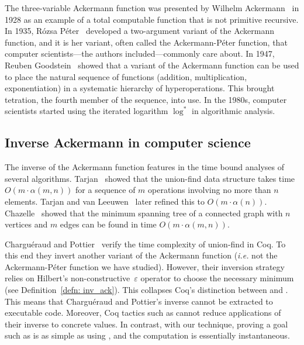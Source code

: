 The three-variable Ackermann function was presented by Wilhelm Ackermann~\cite{ackermann} in 1928 as an example of a total computable function that is not primitive recursive.
In 1935, Rózsa Péter~\cite{peter} developed a two-argument variant of the Ackermann 
function, and it is her variant, often called the Ackermann-Péter function,
that computer scientists---the authors included---commonly care about.
In 1947, Reuben Goodstein~\cite{goodstein} showed that a variant of the Ackermann function 
can be used to place the natural sequence of functions (addition, multiplication,
exponentiation) in a systematic hierarchy of hyperoperations. 
This brought tetration, the fourth member of the sequence, into use.
In the 1980s, computer scientists started using the
iterated logarithm $\log^*$ in algorithmic analysis.

\subsection{Inverse Ackermann in computer science}

The inverse of the Ackermann function
features in the time bound analyses of several algorithms.
Tarjan~\cite{tarjan} showed that the union-find data structure
takes time \mbox{$O(m\cdot\alpha(m,n))$} for a sequence of $m$ operations
involving no more than $n$ elements.
Tarjan and van Leeuwen~\cite{tarjan2} later refined this to $O(m\cdot\alpha(n))$.
Chazelle~\cite{chazelle} showed that the minimum spanning tree
of a connected graph with $n$ vertices and $m$ edges
can be found in time $O(m\cdot\alpha(m,n))$.

Chargu\'eraud and Pottier~\cite{charpott}
verify the time complexity of union-find in Coq.
To this end they invert another variant of the Ackermann function 
(\emph{i.e.} not the Ackermann-Péter function we have 
studied). 
However, their inversion strategy 
relies on Hilbert's non-constructive~$\varepsilon$ operator 
to choose the necessary minimum (see Definition~\ref{defn: inv_ack}). 
This collapses Coq's distinction between  and .
This means that Chargu\'eraud and Pottier's 
inverse cannot be extracted to executable code.  Moreover, 
Coq tactics such as  cannot reduce applications of
their inverse to concrete values.  In contrast, with our technique,
proving a goal such as  is as simple as 
using , and the computation is essentially instantaneous.

